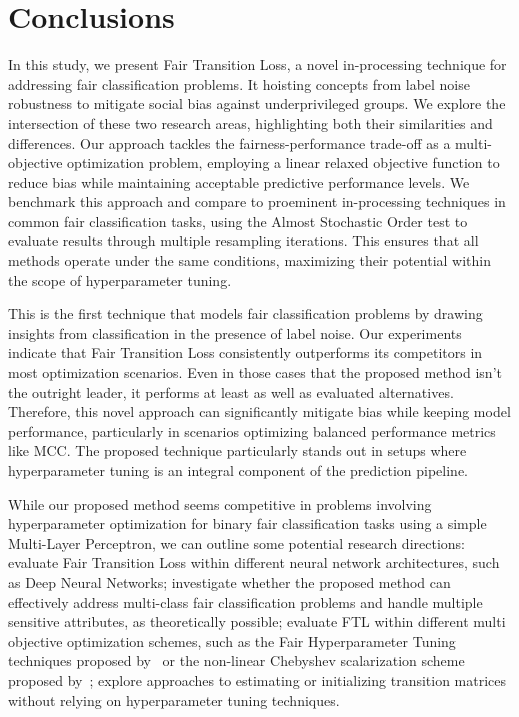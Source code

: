 \chapter{Conclusions}

\label{sec:conclusions}

In this study, we present Fair Transition Loss, a novel in-processing technique for addressing fair classification problems. It hoisting concepts from label noise robustness to mitigate social bias against underprivileged groups. We explore the intersection of these two research areas, highlighting both their similarities and differences. Our approach tackles the fairness-performance trade-off as a multi-objective optimization problem, employing a linear relaxed objective function to reduce bias while maintaining acceptable predictive performance levels. We benchmark this approach and compare to proeminent in-processing techniques in common fair classification tasks, using the Almost Stochastic Order test to evaluate results through multiple resampling iterations. This ensures that all methods operate under the same conditions, maximizing their potential within the scope of hyperparameter tuning.

This is the first technique that models fair classification problems by drawing insights from classification in the presence of label noise. Our experiments indicate that Fair Transition Loss consistently outperforms its competitors in most optimization scenarios. Even in those cases that the proposed method isn't the outright leader, it performs at least as well as evaluated alternatives. Therefore, this novel approach can significantly mitigate bias while keeping model performance, particularly in scenarios optimizing balanced performance metrics like MCC. The proposed technique particularly stands out in setups where hyperparameter tuning is an integral component of the prediction pipeline.

While our proposed method seems competitive in problems involving hyperparameter optimization for binary fair classification tasks using a simple Multi-Layer Perceptron, we can outline some potential research directions: evaluate Fair Transition Loss within different neural network architectures, such as Deep Neural Networks; investigate whether the proposed method can effectively address multi-class fair classification problems and handle multiple sensitive attributes, as theoretically possible; evaluate FTL within different multi objective optimization schemes, such as the Fair Hyperparameter Tuning techniques proposed by~\cite{Cruz2021} or the non-linear Chebyshev scalarization scheme proposed by~\cite{Wei2022}; explore approaches to estimating or initializing transition matrices without relying on hyperparameter tuning techniques. 

